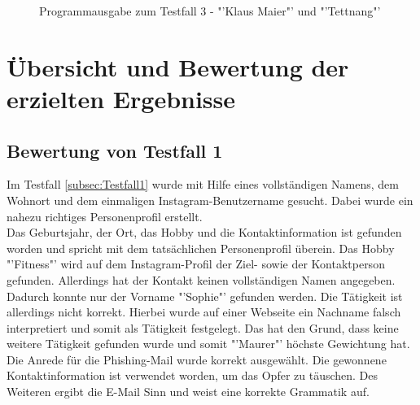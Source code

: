 			\begin{figure}[h!]
				\caption{Programmausgabe zum Testfall 3 - "'Klaus Maier"' und "'Tettnang"'}
			\end{figure}
			\FloatBarrier
			
\section{Übersicht und Bewertung der erzielten Ergebnisse}
	\subsection{Bewertung von Testfall 1}
	Im Testfall \ref{subsec:Testfall1} wurde mit Hilfe eines vollständigen Namens, dem Wohnort und dem einmaligen Instagram-Benutzername gesucht. Dabei wurde ein nahezu richtiges Personenprofil erstellt.\\
	Das Geburtsjahr, der Ort, das Hobby und die Kontaktinformation ist gefunden worden und spricht mit dem tatsächlichen Personenprofil überein. Das Hobby "'Fitness"' wird auf dem Instagram-Profil der Ziel- sowie der Kontaktperson gefunden. Allerdings hat der Kontakt keinen vollständigen Namen angegeben. Dadurch konnte nur der Vorname "'Sophie"' gefunden werden. Die Tätigkeit ist allerdings nicht korrekt. Hierbei wurde auf einer Webseite ein Nachname falsch interpretiert und somit als Tätigkeit festgelegt. Das hat den Grund, dass keine weitere Tätigkeit gefunden wurde und somit "'Maurer"' höchste Gewichtung hat. \\ %
	Die Anrede für die Phishing-Mail wurde korrekt ausgewählt. Die gewonnene Kontaktinformation ist verwendet worden, um das Opfer zu täuschen. Des Weiteren ergibt die E-Mail Sinn und weist eine korrekte Grammatik auf. 

